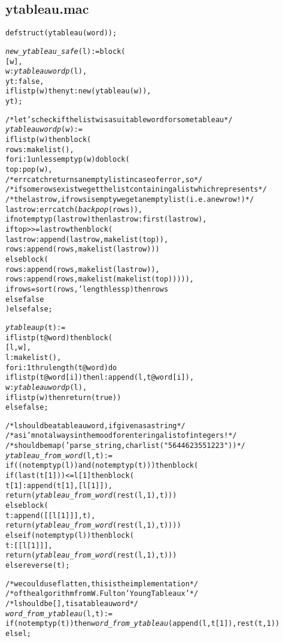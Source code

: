 \subsection*{ytableau.mac}
\begin{alltt}
\footnotesize
defstruct (ytableau (word));

\emph{new\_ytableau\_safe} (l) := block (
  [w],
  w : \emph{ytableauwordp} (l),
  yt : false,
  if listp (w) then yt : new (ytableau (w)),
  yt);

/* let's check if the list w is a suitable word for some tableau */
\emph{ytableauwordp} (w) :=
if listp (w) then block (
  rows : makelist (),
  for i:1 unless emptyp (w) do block (
    top : pop (w),
    /* errcatch returns an empty list in case of error, so */
    /* if some rows exist we get the list containing a list which represents */
    /* the last row, if rows is empty we get an empty list (i.e. a new row!) */
    lastrow : errcatch (\emph{backpop} (rows)),
    if not emptyp (lastrow) then lastrow : first (lastrow),
    if top >>= lastrow then block (
      lastrow : append (lastrow, makelist (top)),
      rows : append (rows, makelist (lastrow)))
    else block (
      rows : append (rows, makelist (lastrow)),
      rows : append (rows, makelist (makelist (top))))),
  if rows = sort (rows, 'lengthlessp) then rows
  else false
) else false;

\emph{ytableaup} (t) :=
if listp (t@word) then block (
  [l,w],
  l : makelist (),
  for i : 1 thru length (t@word) do
  if listp (t@word[i]) then l : append (l, t@word[i]),
  w : \emph{ytableauwordp} (l),
  if listp (w) then return (true))
else false;

/* l should be a tableau word, if given as a string */
/* as i'm not always in the mood for entering a list of integers! */
/* should be map ('parse\_string, charlist ("5644623551223")) */
\emph{ytableau\_from\_word} (l,t) :=
if ((not emptyp (l)) and (not emptyp (t))) then block (
  if (last (t[1])) <= l[1] then block (
    t[1] : append (t[1], [l[1]]),
    return (\emph{ytableau\_from\_word} (rest (l, 1), t)))
  else block (
    t : append ([[l[1]]], t),
    return (\emph{ytableau\_from\_word} (rest (l, 1), t))))
else if (not emptyp (l)) then block (
  t : [[l[1]]],
  return (\emph{ytableau\_from\_word} (rest (l, 1), t)))
else reverse (t);

/* we could use flatten, this is the implementation */
/* of the algorithm from W.Fulton 'Young Tableaux' */
/* l should be [], t is a tableau word */
\emph{word\_from\_ytableau} (l, t) :=
if (not emptyp (t)) then \emph{word\_from\_ytableau} (append (l, t[1]), rest (t, 1))
else l;


\end{alltt}
